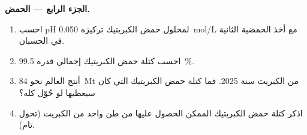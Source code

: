 \begin{problem}
\medskip
\noindent\textbf{الجزء الرابع --- الحمض.}
\begin{enumerate}[resume]
  \item احسب pH لمحلول حمض الكبريتيك تركيزه \qty{0.050}{mol/L}
        مع أخذ الحمضية الثانية في الحسبان.
  \item احسب كتلة حمض الكبريتيك  إجمالي قدره \qty{99.5}{\percent}.
  \item أنتج العالم نحو \qty{84}{Mt} من الكبريت سنة 2025. فما
        كتلة حمض الكبريتيك التي كان سيعطيها لو حُوّل كله؟
  \item اذكر كتلة حمض الكبريتيك الممكن الحصول عليها من طن واحد من
        الكبريت (تحول تام).
\end{enumerate}
\end{problem}
